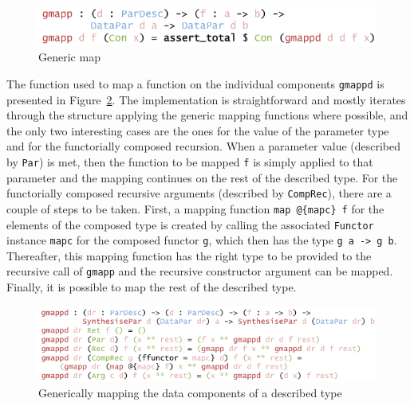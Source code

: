 \documentclass{ituthesis}
\newcommand{\ttconstructor}[1]{\textcolor{constructor-color}{\texttt{#1}}}
\newcommand{\ttdec}[1]{\textcolor{declared-var-color}{\texttt{#1}}}
\newcommand{\ttvar}[1]{\textcolor{local-var-color}{\texttt{#1}}}
\theoremstyle{break}
\begin{document}
\begin{figure}[ht]
\begin{center}
    \includegraphics[scale=0.5]{Figures/GenericMap.png}
\end{center}
\caption{Generic map}
\label{fig:mapgen}
\end{figure}

The function used to map a function on the individual components \ttdec{gmappd} is presented in Figure~\ref{fig:mapgendesc}.
The implementation is straightforward and mostly iterates through the structure applying the generic mapping functions where possible, and the only two interesting cases are the ones for the value of the parameter type
and for the functorially composed recursion.
When a parameter value (described by \ttconstructor{Par}) is met, then the function to be mapped \ttvar{f} is simply applied to that parameter and the mapping continues on the rest of the described type.
For the functorially composed recursive arguments (described by \ttconstructor{CompRec}), there are a couple of steps to be taken.
First, a mapping function \ttdec{map}~\texttt{@\{}\ttvar{mapc}\texttt{\}}~\ttvar{f} for the elements of the composed type is created by calling the associated \ttvar{Functor} instance \ttvar{mapc} for the composed functor \ttvar{g}, which then has the type \ttvar{g}~\ttvar{a}~\texttt{->}~\ttvar{g}~\ttvar{b}.
Thereafter, this mapping function has the right type to be provided to the recursive call of \ttdec{gmapp} and the recursive constructor argument can be mapped.
Finally, it is possible to map the rest of the described type.

\begin{figure}[ht]
\begin{center}
    \includegraphics[scale=0.5]{Figures/GenericMapDesc.png}
\end{center}
\caption{Generically mapping the data components of a described type}
\label{fig:mapgendesc}
\end{figure}
\end{document}
